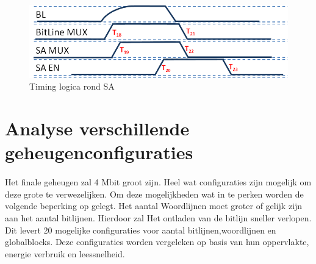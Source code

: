 \begin{figure}[!ht]
  \centering
  \includegraphics[scale=0.9]{../fig/hfdstk-timing-sa2.png}
  \caption{Timing logica rond SA}
  \label{fig:sa_timing2}
\end{figure}

\section{Analyse verschillende geheugenconfiguraties}
\paragraph{}
Het finale geheugen zal 4 Mbit groot zijn. Heel wat configuraties zijn mogelijk om deze grote te verwezelijken. Om deze mogelijkheden wat in te perken worden de volgende beperking op gelegt. Het aantal Woordlijnen moet groter of gelijk zijn aan het aantal bitlijnen. Hierdoor zal Het ontladen van de bitlijn sneller verlopen. Dit levert 20 mogelijke configuraties voor aantal bitlijnen,woordlijnen en globalblocks. Deze configuraties worden vergeleken op basis van hun oppervlakte, energie verbruik en leessnelheid. 

